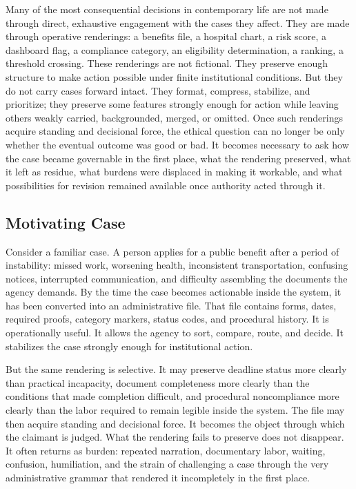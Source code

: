 \documentclass[11pt]{article}
\begin{document}
Many of the most consequential decisions in contemporary life are not made through direct, exhaustive engagement with the cases they affect. They are made through operative renderings: a benefits file, a hospital chart, a risk score, a dashboard flag, a compliance category, an eligibility determination, a ranking, a threshold crossing. These renderings are not fictional. They preserve enough structure to make action possible under finite institutional conditions. But they do not carry cases forward intact. They format, compress, stabilize, and prioritize; they preserve some features strongly enough for action while leaving others weakly carried, backgrounded, merged, or omitted. Once such renderings acquire standing and decisional force, the ethical question can no longer be only whether the eventual outcome was good or bad. It becomes necessary to ask how the case became governable in the first place, what the rendering preserved, what it left as residue, what burdens were displaced in making it workable, and what possibilities for revision remained available once authority acted through it. \cite{MoynihanHerdHarvey2015AdministrativeBurden,Eubanks2018AutomatingInequality,LepriEtAl2018FairTransparentAccountableADM,Tabassi2023NISTAIRMF,BowkerStar1999SortingThingsOut}

\subsection{Motivating Case}

Consider a familiar case. A person applies for a public benefit after a period of instability: missed work, worsening health, inconsistent transportation, confusing notices, interrupted communication, and difficulty assembling the documents the agency demands. By the time the case becomes actionable inside the system, it has been converted into an administrative file. That file contains forms, dates, required proofs, category markers, status codes, and procedural history. It is operationally useful. It allows the agency to sort, compare, route, and decide. It stabilizes the case strongly enough for institutional action.

But the same rendering is selective. It may preserve deadline status more clearly than practical incapacity, document completeness more clearly than the conditions that made completion difficult, and procedural noncompliance more clearly than the labor required to remain legible inside the system. The file may then acquire standing and decisional force. It becomes the object through which the claimant is judged. What the rendering fails to preserve does not disappear. It often returns as burden: repeated narration, documentary labor, waiting, confusion, humiliation, and the strain of challenging a case through the very administrative grammar that rendered it incompletely in the first place. \cite{MoynihanHerdHarvey2015AdministrativeBurden,Eubanks2018AutomatingInequality,BowkerStar1999SortingThingsOut}
\end{document}
